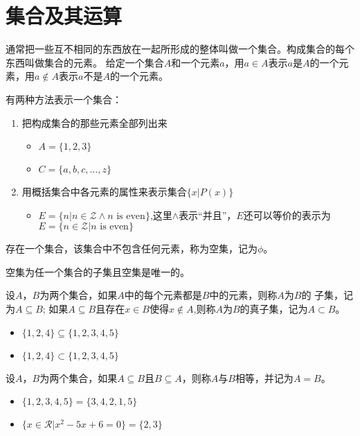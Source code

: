 \chapter{集合及其运算}
  \begin{Def}
    通常把一些互不相同的东西放在一起所形成的整体叫做一个集合。构成集合的每个东西叫做集合的元素。
给定一个集合$A$和一个元素$a$，用$a \in A$表示$a$是$A$的一个元素，用$a \notin A$表示$a$不是$A$的一个元素。
  \end{Def}

  有两种方法表示一个集合：
\begin{enumerate}
\item 把构成集合的那些元素全部列出来
  \begin{itemize}
  \item $A = \{1, 2, 3\}$
\item $C = \{a, b, c, \ldots, z\}$
  \end{itemize}
\item 用概括集合中各元素的属性来表示集合$\{x|P(x)\}$
\begin{itemize}
\item $E = \{n|n \in \mathcal{Z} \land n\text{ is even}\}$,这里$\land$表示“并且”，$E$还可以等价的表示为$E = \{n \in \mathcal{Z} | n\text{ is even}\}$
\end{itemize}
\end{enumerate}

存在一个集合，该集合中不包含任何元素，称为空集，记为$\phi$。
  \begin{Thm}
   空集为任一个集合的子集且空集是唯一的。 
  \end{Thm}

  
    \begin{Def}
    设$A$，$B$为两个集合，如果$A$中的每个元素都是$B$中的元素，则称$A$为$B$的
子集，记为$A \subseteq B$; 如果$A \subseteq B$且存在$x\in B$使得$x \notin A$,则称$A$为$B$的真子集，记为$A\subset B$。    
\end{Def}
\begin{itemize}
  \item   $\{1,2,4\} \subseteq \{1,2,3,4,5\}$
\item $\{1,2,4\} \subset \{1,2,3,4,5\}$
  \end{itemize}

    \begin{Def}
    设$A$，$B$为两个集合，如果$A \subseteq B$且$B \subseteq A$，则称$A$与$B$相等，并记为$A=B$。
  \end{Def}
    \begin{itemize}
  \item   $\{1,2,3,4,5\} = \{3,4,2,1,5\}$
\item $\{x \in \mathcal{R} | x^2 -5x + 6 = 0\} = \{2,3\}$
  \end{itemize}

